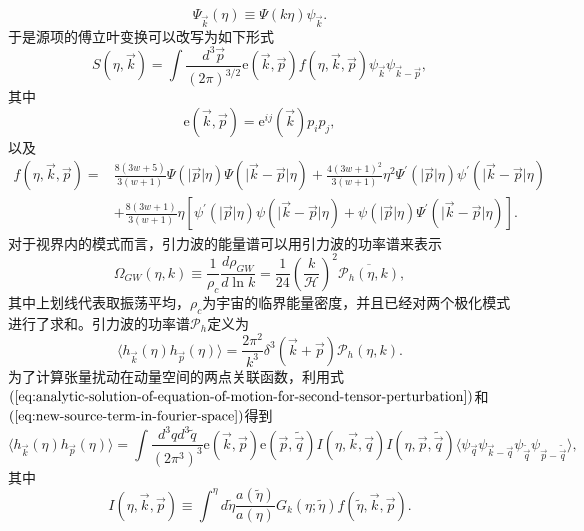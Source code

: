 \begin{equation}
  \Psi_{\vec{k}}(\eta) \equiv \Psi(k\eta)\psi_{\vec{k}}. 
\end{equation}
于是源项的傅立叶变换可以改写为如下形式
\begin{equation}
  \label{eq:new-source-term-in-fourier-space}
  S(\eta, \vec{k}) = \int \frac{d^3 \vec{p}}{{\left(2\pi \right)}^{3 /2}} 
  \mathrm{e}(\vec{k}, \vec{p})f(\eta, \vec{k}, \vec{p})
  \psi_{\vec{k}}\psi_{\vec{k}-\vec{p}},
\end{equation}
其中
\begin{equation}
  \mathrm{e}(\vec{k},\vec{p}) = \mathrm{e}^{ij}(\vec{k})p_{i}p_{j},
\end{equation}
以及
\begin{equation}
  \begin{split}
    f(\eta, \vec{k}, \vec{p}) = & \frac{8(3w+5)}{3(w+1)}
    \Psi(\lvert \vec{p}\rvert\eta)\Psi(\lvert \vec{k}-\vec{p}\rvert\eta) +
    \frac{4{\left(3w+1\right)}^2}{3(w+1)}\eta^2 \Psi^\prime(\lvert
    \vec{p}\rvert\eta) \psi^\prime(\lvert \vec{k}-\vec{p}\rvert\eta) \\
    & + \frac{8(3w+1)}{3(w+1)}\eta 
    \left[ \psi^\prime(\lvert \vec{p}\rvert \eta)\psi(\lvert
    \vec{k}-\vec{p}\rvert\eta)+\psi(\lvert
    \vec{p}\rvert\eta)\Psi^\prime(\lvert \vec{k}-\vec{p}\rvert\eta) \right].
  \end{split}
\end{equation}
对于视界内的模式而言，引力波的能量谱可以用引力波的功率谱来表示
\begin{equation}
  \label{eq:energy-spectrum-for-GW-in-power-spectrum}
  \Omega_{GW}(\eta, k) \equiv \frac{1}{\rho_{c}} \frac{d\rho_{GW}}{d \ln k}
  = \frac{1}{24} {\left(\frac{k}{\mathcal{H}}\right)}^2
  \overline{\mathcal{P}_{h}(\eta, k)},
\end{equation}
其中上划线代表取振荡平均，$\rho_{c}$为宇宙的临界能量密度，并且已经对两个极化模式进行了求和。引力波的功率谱$\mathcal{P}_{h}$定义为
\begin{equation}
  \label{eq:power-spectrum-definition-of-GW}
  \langle h_{\vec{k}}(\eta)h_{\vec{p}}(\eta)\rangle = \frac{2\pi^2}{k^3} 
  \delta^3(\vec{k}+\vec{p})\mathcal{P}_{h}(\eta, k).
\end{equation}
为了计算张量扰动在动量空间的两点关联函数，利用式$(\ref{eq:analytic-solution-of-equation-of-motion-for-second-tensor-perturbation})$和$(\ref{eq:new-source-term-in-fourier-space})$得到
\begin{equation}
  \langle h_{\vec{k}}(\eta)h_{\vec{p}}(\eta)\rangle = \int
  \frac{d^3q d^3 \tilde{q}}{{\left(2\pi^3\right)}^3}
  \mathrm{e}(\vec{k},\vec{p})\mathrm{e}(\vec{p}, \tilde{\vec{q}})
  I(\eta, \vec{k},\vec{q})I(\eta, \vec{p}, \tilde{\vec{q}})
  \langle
  \psi_{\vec{q}}\psi_{\vec{k}-\vec{q}}\psi_{\tilde{\vec{q}}}\psi_{\vec{p}-\tilde{\vec{q}}}\rangle,
\end{equation}
其中
\begin{equation}
  I(\eta, \vec{k},\vec{p}) \equiv \int^{\eta} d \tilde{\eta}
  \frac{a(\tilde{\eta})}{a(\eta)} G_{k}(\eta;\tilde{\eta})f(\tilde{\eta},
  \vec{k}, \vec{p}).  
\end{equation}

